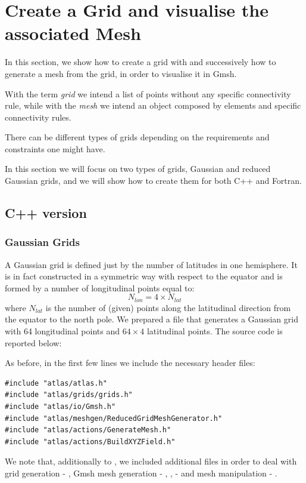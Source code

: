 \chapter{Create a Grid and visualise the associated Mesh}
In this section, we show how to create a grid with \Atlas 
and successively how to generate a mesh from the grid, in 
order to visualise it in Gmsh.
% 
\begin{notebox}
With the term \textit{grid} we intend a list of points without 
any specific connectivity rule, while with the \textit{mesh} 
we intend an object composed by elements and specific connectivity 
rules.
\end{notebox}
%
There can be different types of grids depending on the requirements 
and constraints one might have. 

In this section we will focus on two types of grids, Gaussian 
and reduced Gaussian grids, and we will show how to create them 
for both C++ and Fortran.



\section{C++ version}
\subsection{Gaussian Grids}
A Gaussian grid is defined just by the number of latitudes in one 
hemisphere. It is in fact constructed in a symmetric way with respect 
to the equator and is formed by a number of longitudinal points equal 
to:
%
\begin{equation}
N_{lon} = 4 \times N_{lat}
\end{equation}
%
where $N_{lat}$ is the number of (given) points along the latitudinal 
direction from the equator to the north pole. We prepared a file that 
generates a Gaussian grid with 64 longitudinal points and $64\times 4$ 
latitudinal points. The source code is reported below:
%

%
As before, in the first few lines we include the necessary \Atlas 
header files:
%
\begin{lstlisting}[style=CStyleNoLine]
#include "atlas/atlas.h"
#include "atlas/grids/grids.h"
#include "atlas/io/Gmsh.h"
#include "atlas/meshgen/ReducedGridMeshGenerator.h"
#include "atlas/actions/GenerateMesh.h"
#include "atlas/actions/BuildXYZField.h"
\end{lstlisting}
%
We note that, additionally to , we included additional 
files in order to deal with grid generation - , Gmsh 
mesh generation - , , 
 - and mesh manipulation - .

